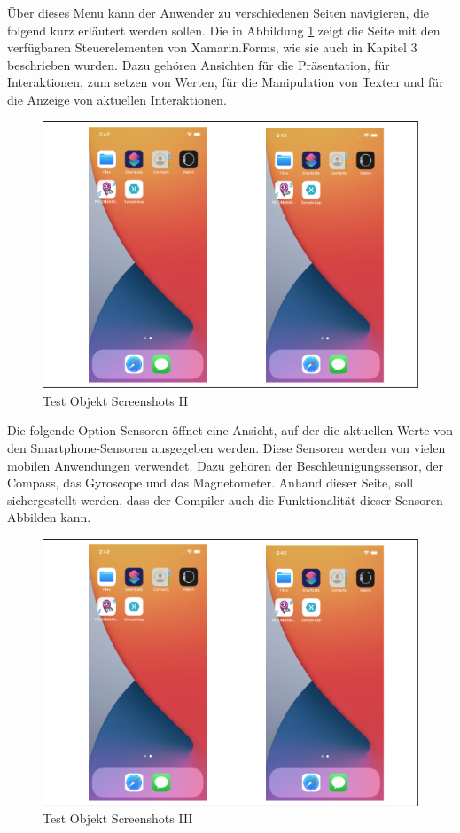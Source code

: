 Über dieses Menu kann der Anwender zu verschiedenen Seiten navigieren, die folgend kurz erläutert werden sollen.  Die in Abbildung \ref{fig:TestObjectII} zeigt die Seite mit den verfügbaren Steuerelementen von Xamarin.Forms,  wie sie auch in Kapitel 3 beschrieben wurden. Dazu gehören Ansichten für die Präsentation, für Interaktionen, zum setzen von Werten, für die Manipulation von Texten und für die Anzeige von aktuellen Interaktionen.
\begin{figure}[!ht]
 \includegraphics[width=\textwidth,keepaspectratio]{Images/Screenshot/AppIconAndMenu.png}
 \caption{Test Objekt Screenshots II}
 \label{fig:TestObjectII}
\end{figure}

Die folgende Option Sensoren öffnet eine Ansicht, auf der die aktuellen Werte von den Smartphone-Sensoren ausgegeben werden.  Diese Sensoren werden von vielen mobilen Anwendungen verwendet. Dazu gehören der Beschleunigungssensor, der Compass,  das Gyroscope und das Magnetometer.  Anhand dieser Seite,  soll sichergestellt werden, dass der Compiler auch die Funktionalität dieser Sensoren Abbilden kann. 

\begin{figure}[!ht]
 \includegraphics[width=\textwidth,keepaspectratio]{Images/Screenshot/AppIconAndMenu.png}
 \caption{Test Objekt Screenshots III}
 \label{fig:TestObjectI}
\end{figure}


